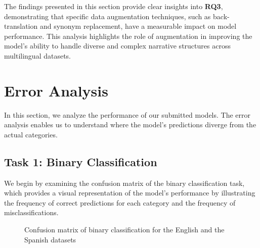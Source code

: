 \documentclass{Configuration_Files/PoliMi3i_thesis}
\begin{document}
The findings presented in this section provide clear insights into \textbf{RQ3}, demonstrating that specific data augmentation techniques, such as back-translation and synonym replacement, have a measurable impact on model performance. This analysis highlights the role of augmentation in improving the model's ability to handle diverse and complex narrative structures across multilingual datasets.


\chapter{Error Analysis} \label{chap:error_analysis}
In this section, we analyze the performance of our submitted models. The error analysis enables us to understand where the model's predictions diverge from the actual categories. 

\section{Task 1: Binary Classification}
We begin by examining the confusion matrix of the binary classification task, which provides a visual representation of the model's performance by illustrating the frequency of correct predictions for each category and the frequency of misclassifications.

\begin{figure}[H]
    \centering
    \caption{Confusion matrix of binary classification for the English and the Spanish datasets}
    \label{fig:confusion_matrix_en_es}
\end{figure}
\FloatBarrier
\end{document}
